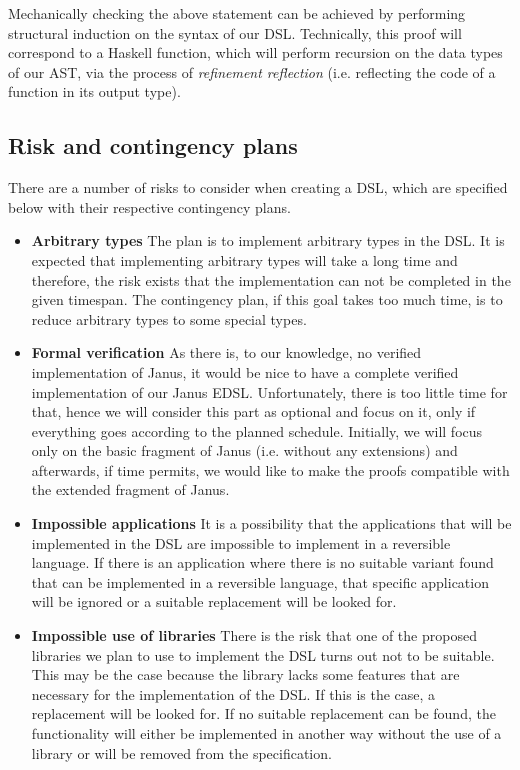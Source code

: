 \documentclass[12pt,a4paper]{article}
\begin{document}
Mechanically checking the above statement can be achieved by performing structural induction on the syntax of our DSL. Technically, this proof will correspond to a Haskell function, which will perform recursion on the data types of our AST, via the process of \textit{refinement reflection} (i.e. reflecting the code of a function in its output type).

\subsection{Risk and contingency plans}
There are a number of risks to consider when creating a DSL, which are specified below with their respective contingency plans.
\begin{itemize}
\item \textbf{Arbitrary types} The plan is to implement arbitrary types in the DSL. It is expected that implementing arbitrary types will take a long time and therefore, the risk exists that the implementation can not be completed in the given timespan. The contingency plan, if this goal takes too much time, is to reduce arbitrary types to some special types.
\item \textbf{Formal verification} As there is, to our knowledge, no verified implementation of Janus, it would be nice to have a complete verified implementation of our Janus EDSL. Unfortunately, there is too little time for that, hence we will consider this part as optional and focus on it, only if everything goes according to the planned schedule. Initially, we will focus only on the basic fragment of Janus (i.e. without any extensions) and afterwards, if time permits, we would like to make the proofs compatible with the extended fragment of Janus.
\item \textbf{Impossible applications} It is a possibility that the applications that will be implemented in the DSL are impossible to implement in a reversible language. If there is an application where there is no suitable variant found that can be implemented in a reversible language, that specific application will be ignored or a suitable replacement will be looked for. 
\item \textbf{Impossible use of libraries} There is the risk that one of the proposed libraries we plan to use to implement the DSL turns out not to be suitable. This may be the case because the library lacks some features that are necessary for the implementation of the DSL. If this is the case, a replacement will be looked for. If no suitable replacement can be found, the functionality will either be implemented in another way without the use of a library or will be removed from the specification.
\end{itemize}
\end{document}

